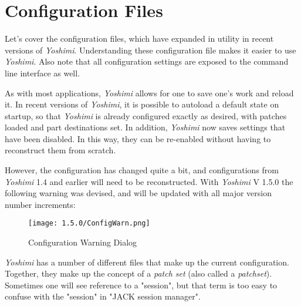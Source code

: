 %
%
%

\section{Configuration Files}
\label{sec:configuration}

   Let's cover the configuration files, which have expanded in utility in
   recent versions of \textsl{Yoshimi}.
   Understanding these configuration file makes it easier to
   use \textsl{Yoshimi}.
   Also note that all configuration settings are exposed to the command line
   interface as well.

   As with most applications, \textsl{Yoshimi} allows for one to save one's
   work and reload it. In recent versions of \textsl{Yoshimi}, it is possible
   to autoload a default state on startup, so that \textsl{Yoshimi} is
   already configured exactly as desired, with patches loaded and part
   destinations set.
   In addition, \textsl{Yoshimi} now saves settings that have been disabled.
   In this way, they can be re-enabled without having to reconstruct them from
   scratch.

   However, the configuration has changed quite a bit, and configurations from
   \textsl{Yoshimi} 1.4 and earlier will need to be reconstructed. With
   \textsl{Yoshimi} V 1.5.0 the following warning was devised, and will be updated
   with all major version number increments:

\begin{figure}[H]
   \centering
   \texttt{[image: 1.5.0/ConfigWarn.png]}
   \caption{Configuration Warning Dialog}
   \label{fig:config_warn_dialog}
\end{figure}

   \textsl{Yoshimi} has a number of different files that make up the current
   configuration.
   Together, they make up the concept of a \textsl{patch set} (also called a
   \textsl{patchset}).
   Sometimes one will see reference to a "session", but that term is too easy
   to confuse with the "session" in "JACK session manager".

